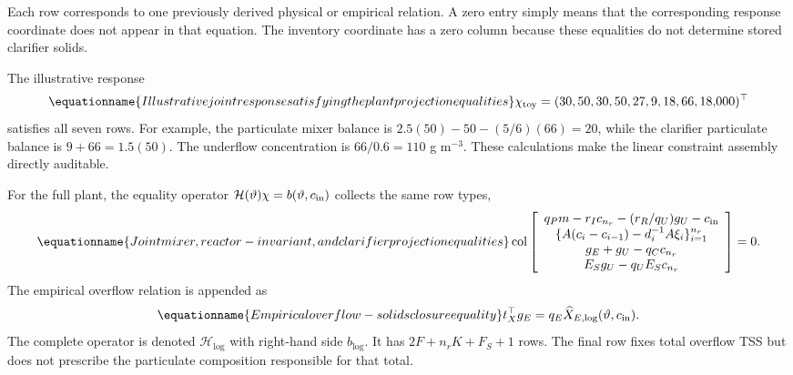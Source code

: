 Each row corresponds to one previously derived physical or empirical relation. A zero entry simply means that the corresponding response coordinate does not appear in that equation. The inventory coordinate has a zero column because these equalities do not determine stored clarifier solids.

The illustrative response
\begin{equation}
\equationname{Illustrative joint response satisfying the plant projection equalities}
\chi_{\rm toy}=(30,50,30,50,27,9,18,66,18{,}000)^\top
\end{equation}
satisfies all seven rows. For example, the particulate mixer balance is $2.5(50)-50-(5/6)(66)=20$, while the clarifier particulate balance is $9+66=1.5(50)$. The underflow concentration is $66/0.6=110$ g m$^{-3}$. These calculations make the linear constraint assembly directly auditable.

For the full plant, the equality operator $\mathcal H(\vartheta)\chi=b(\vartheta,c_{\rm in})$ collects the same row types,
\begin{equation}
\equationname{Joint mixer, reactor-invariant, and clarifier projection equalities}
\operatorname{col}\left[
\begin{array}{c}
q_Pm-r_Ic_{n_r}-(r_R/q_U)g_U-c_{\rm in}\\
\{A(c_i-c_{i-1})-d_i^{-1}A\xi_i\}_{i=1}^{n_r}\\
g_E+g_U-q_Cc_{n_r}\\
E_Sg_U-q_UE_Sc_{n_r}
\end{array}\right]=0.
\label{eq:plant_projection_equalities}
\end{equation}
The empirical overflow relation is appended as
\begin{equation}
\equationname{Empirical overflow-solids closure equality}
t_X^\top g_E=q_E\widehat X_{E,\log}(\vartheta,c_{\rm in}).
\label{eq:plant_overflow_closure}
\end{equation}
The complete operator is denoted $\mathcal H_{\log}$ with right-hand side $b_{\log}$. It has $2F+n_rK+F_S+1$ rows. The final row fixes total overflow TSS but does not prescribe the particulate composition responsible for that total.

